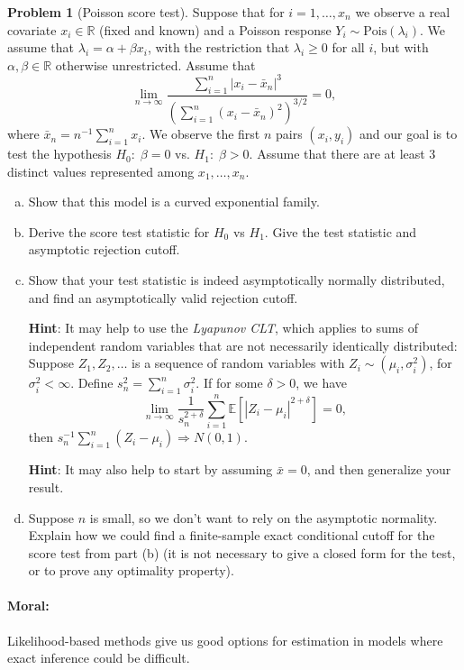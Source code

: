 \documentclass{article}
\newcommand{\EE}{\mathbb{E}}
\newcommand{\RR}{\mathbb{R}}
\theoremstyle{definition}
\newtheorem{problem}{Problem}
\begin{document}
\begin{problem}[Poisson score test]
\label{prob:poisson-score}
Suppose that for $i=1,\ldots,x_n$ we observe a real covariate $x_i \in \RR$ (fixed and known) and a Poisson response $Y_i \sim \text{Pois}(\lambda_i)$. We assume that $\lambda_i = \alpha + \beta x_i$, with the restriction that $\lambda_i \geq 0$ for all $i$, but with $\alpha, \beta \in \RR$ otherwise unrestricted. Assume that
\[
\lim_{n \to \infty} \frac{\sum_{i=1}^n |x_i - \bar{x}_n|^3}{\left(\sum_{i=1}^n (x_i-\bar{x}_n)^2\right)^{3/2}} = 0,
\]
where $\bar{x}_n = n^{-1}\sum_{i=1}^n x_i$. We observe the first $n$ pairs $(x_i,y_i)$ and our goal is to test the hypothesis $H_0:\; \beta = 0$ vs. $H_1:\; \beta > 0$. Assume that there are at least 3 distinct values represented among $x_1,\ldots,x_n$.

\begin{enumerate}[(a)]
\item Show that this model is a curved exponential family.



\item Derive the score test statistic for $H_0$ vs $H_1$. Give the test statistic and asymptotic rejection cutoff.




\item Show that your test statistic is indeed asymptotically normally distributed, and find an asymptotically valid rejection cutoff.

{\bf Hint}: It may help to use the {\em Lyapunov CLT}, which applies to sums of independent random variables that are  not necessarily identically distributed: Suppose $Z_1,Z_2,\ldots$ is a sequence of random variables with $Z_i \sim (\mu_i, \sigma_i^2)$, for $\sigma_i^2 < \infty$. Define $s_n^2 = \sum_{i=1}^n \sigma_i^2$. If for some $\delta > 0$, we have
\[
\lim_{n \to \infty} \frac{1}{s_n^{2+\delta}} \sum_{i=1}^n \EE\left[|Z_i - \mu_i|^{2+\delta}\right] = 0,
\]
then $s_n^{-1}\sum_{i=1}^n (Z_i - \mu_i) \Rightarrow N(0,1)$.

{\bf Hint}: It may also help to start by assuming $\bar{x} = 0$, and then generalize your result.




\item Suppose $n$ is small, so we don't want to rely on the asymptotic normality. Explain how we could find a finite-sample exact conditional cutoff for the score test from part (b) (it is not necessary to give a closed form for the test, or to prove any optimality property).


\end{enumerate}

\paragraph{Moral:} Likelihood-based methods give us good options for estimation in models where exact inference could be difficult.

\end{problem}
\end{document}
